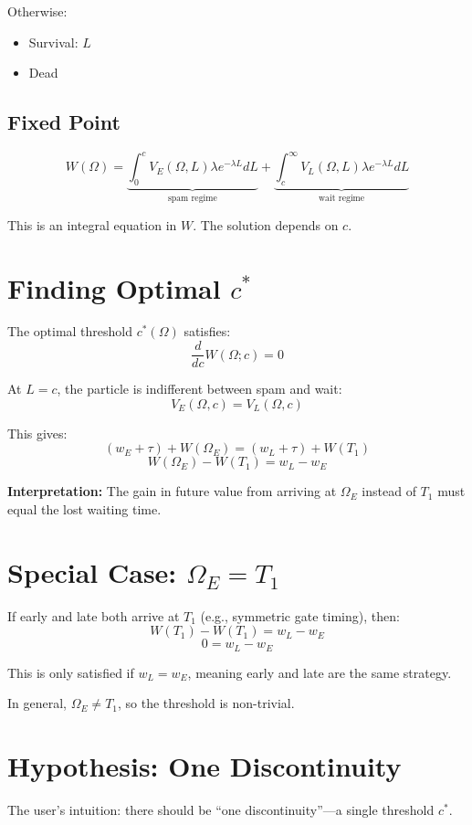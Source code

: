 \documentclass{article}
\begin{document}
Otherwise:
\begin{itemize}
    \item Survival: $L$
    \item Dead
\end{itemize}

\subsection{Fixed Point}

\[
W(\Omega) = \underbrace{\int_0^c V_E(\Omega, L) \lambda e^{-\lambda L} dL}_{\text{spam regime}} + \underbrace{\int_c^\infty V_L(\Omega, L) \lambda e^{-\lambda L} dL}_{\text{wait regime}}
\]

This is an integral equation in $W$. The solution depends on $c$.

\section{Finding Optimal $c^*$}

The optimal threshold $c^*(\Omega)$ satisfies:
\[
\frac{d}{dc} W(\Omega; c) = 0
\]

At $L = c$, the particle is indifferent between spam and wait:
\[
V_E(\Omega, c) = V_L(\Omega, c)
\]

This gives:
\[
(w_E + \tau) + W(\Omega_E) = (w_L + \tau) + W(T_1)
\]
\[
W(\Omega_E) - W(T_1) = w_L - w_E
\]

\textbf{Interpretation:} The gain in future value from arriving at $\Omega_E$ instead of $T_1$ must equal the lost waiting time.

\section{Special Case: $\Omega_E = T_1$}

If early and late both arrive at $T_1$ (e.g., symmetric gate timing), then:
\[
W(T_1) - W(T_1) = w_L - w_E
\]
\[
0 = w_L - w_E
\]

This is only satisfied if $w_L = w_E$, meaning early and late are the same strategy.

In general, $\Omega_E \neq T_1$, so the threshold is non-trivial.

\section{Hypothesis: One Discontinuity}

The user's intuition: there should be ``one discontinuity''—a single threshold $c^*$.
\end{document}
